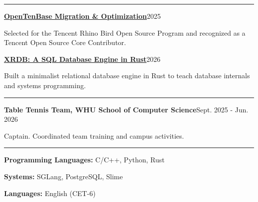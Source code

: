 \documentclass[a4paper,11pt]{article}
\newcommand{\cvsection}[1]{\par\vspace{8pt}{\large\bfseries #1}\par\vspace{1pt}\hrule\vspace{4pt}}
\newcommand{\entry}[2]{\textbf{#1}\hfill #2\par}
\newcommand{\cvbullet}[1]{\begingroup\leftskip=13pt\parindent=-13pt\textbullet\hspace{7pt}#1\par\endgroup}
\begin{document}
\cvsection{Projects}
\entry{\href{https://github.com/WHU-XingyuQu/opentenbase-migrate-v2.6tov5.0}{OpenTenBase Migration \& Optimization}}{2025}
\cvbullet{Selected for the Tencent Rhino Bird Open Source Program and recognized as a Tencent Open Source Core Contributor.}
\vspace{3pt}
\entry{\href{https://github.com/WHU-XingyuQu/XRDB}{XRDB: A SQL Database Engine in Rust}}{2026}
\cvbullet{Built a minimalist relational database engine in Rust to teach database internals and systems programming.}

\cvsection{Service}
\entry{Table Tennis Team, WHU School of Computer Science}{Sept. 2025 - Jun. 2026}
Captain. Coordinated team training and campus activities.

\cvsection{Technology}
\textbf{Programming Languages:} C/C++, Python, Rust\par
\textbf{Systems:} SGLang, PostgreSQL, Slime\par
\textbf{Languages:} English (CET-6)
\end{document}
